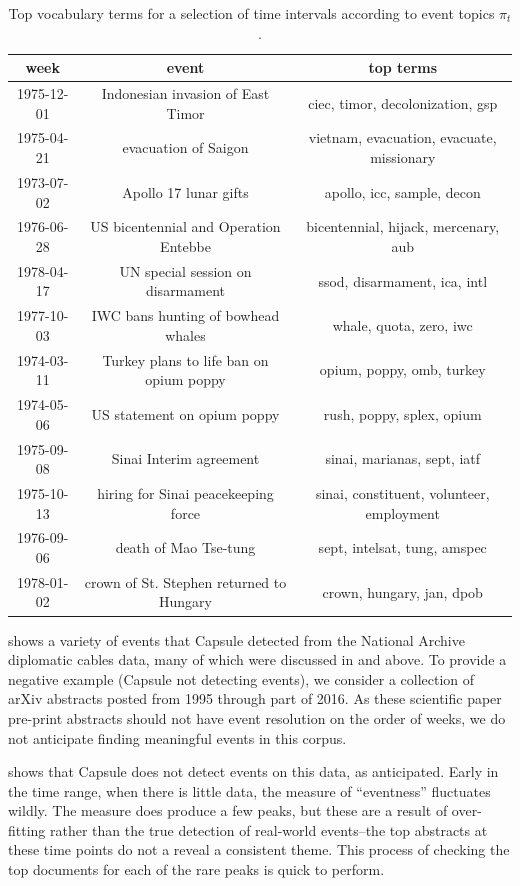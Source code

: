 \begin{table}
\centering
\small
\begin{tabular}{ccc}
\toprule
week & event & top terms \\
\midrule
1975-12-01 & Indonesian invasion of East Timor & ciec, timor, decolonization, gsp \\
1975-04-21 & evacuation of Saigon & vietnam, evacuation, evacuate, missionary \\
1973-07-02 & Apollo 17 lunar gifts & apollo, icc, sample, decon \\
1976-06-28 & US bicentennial and Operation Entebbe & bicentennial, hijack, mercenary, aub \\
1978-04-17 & UN special session on disarmament & ssod, disarmament, ica, intl \\
1977-10-03 & IWC bans hunting of bowhead whales & whale, quota, zero, iwc \\
1974-03-11 & Turkey plans to life ban on opium poppy & opium, poppy, omb, turkey \\
1974-05-06 & US statement on opium poppy & rush, poppy, splex, opium \\
1975-09-08 & Sinai Interim agreement & sinai, marianas, sept, iatf \\
1975-10-13 & hiring for Sinai peacekeeping force & sinai, constituent, volunteer, employment \\
1976-09-06 & death of Mao Tse-tung & sept, intelsat, tung, amspec \\
1978-01-02 & crown of St. Stephen returned to Hungary & crown, hungary, jan, dpob \\
\bottomrule
\end{tabular}
\label{tab:evttopics}
\caption{Top vocabulary terms for a selection of time intervals according to event topics $\pi_t$.}
\end{table}


 shows a variety of events that Capsule detected from the National Archive diplomatic cables data, many of which were discussed in  and above.  To provide a negative example (Capsule not detecting events), we consider a collection of arXiv abstracts posted from 1995 through part of 2016.  As these scientific paper pre-print abstracts should not have event resolution on the order of weeks, we do not anticipate finding meaningful events in this corpus.

 shows that Capsule does not detect events on this data, as anticipated.  Early in the time range, when there is little data, the measure of ``eventness'' fluctuates wildly.  The measure does produce a few peaks, but these are a result of over-fitting rather than the true detection of real-world events--the top abstracts at these time points do not a reveal a consistent theme.  This process of checking the top documents for each of the rare peaks is quick to perform.

